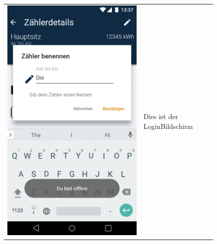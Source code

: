 \begin{figure}[h]
\begin{tabularx}{\textwidth}{X | X}
	\includegraphics[scale = 0.22]{img/AndroidMockup/rename} & Dies ist der LoginBildschirm \\ 
\end{tabularx}
\end{figure}

